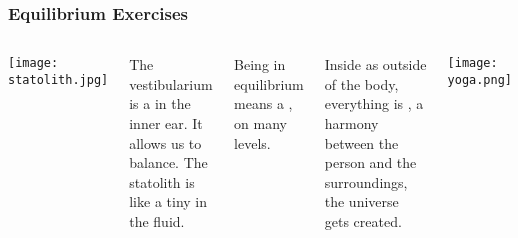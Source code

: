 \begin{frame}
\frametitle{Equilibrium Exercises}
\hypertarget{vesti}{}
\begin{columns}[c] %


\texttt{[image: statolith.jpg]}

The vestibularium is a   in the inner ear. It allows us to balance.
The statolith is like a tiny
 in the fluid.
\pause

Being in equilibrium means a , on many levels.

Inside as outside of the body, everything is , a harmony between the person and the surroundings, the universe gets created.

\texttt{[image: yoga.png]}

\end{columns}

\end{frame}
